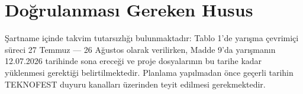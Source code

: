 \documentclass[11pt,a4paper]{article}
\begin{document}
\section{Doğrulanması Gereken Husus}

Şartname içinde takvim tutarsızlığı bulunmaktadır: Tablo 1'de yarışma çevrimiçi
süreci 27 Temmuz --- 26 Ağustos olarak verilirken, Madde 9'da yarışmanın 12.07.2026
tarihinde sona ereceği ve proje dosyalarının bu tarihe kadar yüklenmesi gerektiği
belirtilmektedir. Planlama yapılmadan önce geçerli tarihin TEKNOFEST duyuru kanalları
üzerinden teyit edilmesi gerekmektedir.
\end{document}
